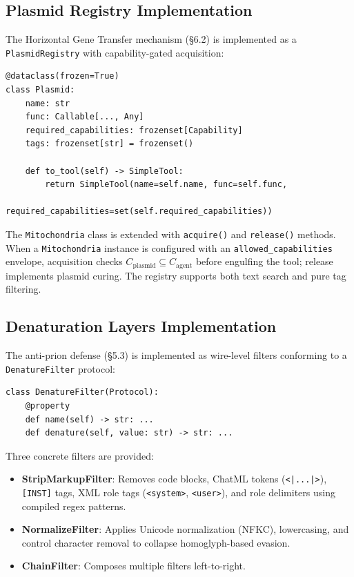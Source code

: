\subsection{Plasmid Registry Implementation}

The Horizontal Gene Transfer mechanism (\S6.2) is implemented as a \texttt{PlasmidRegistry} with capability-gated acquisition:

\begin{verbatim}
@dataclass(frozen=True)
class Plasmid:
    name: str
    func: Callable[..., Any]
    required_capabilities: frozenset[Capability]
    tags: frozenset[str] = frozenset()

    def to_tool(self) -> SimpleTool:
        return SimpleTool(name=self.name, func=self.func,
                          required_capabilities=set(self.required_capabilities))
\end{verbatim}

The \texttt{Mitochondria} class is extended with \texttt{acquire()} and \texttt{release()} methods. When a \texttt{Mitochondria} instance is configured with an \texttt{allowed\_capabilities} envelope, acquisition checks $C_{\text{plasmid}} \subseteq C_{\text{agent}}$ before engulfing the tool; release implements plasmid curing. The registry supports both text search and pure tag filtering.

\subsection{Denaturation Layers Implementation}

The anti-prion defense (\S5.3) is implemented as wire-level filters conforming to a \texttt{DenatureFilter} protocol:

\begin{verbatim}
class DenatureFilter(Protocol):
    @property
    def name(self) -> str: ...
    def denature(self, value: str) -> str: ...
\end{verbatim}

Three concrete filters are provided:
\begin{itemize}[leftmargin=*]
\item \textbf{StripMarkupFilter}: Removes code blocks, ChatML tokens (\texttt{<|...|>}), \texttt{[INST]} tags, XML role tags (\texttt{<system>}, \texttt{<user>}), and role delimiters using compiled regex patterns.
\item \textbf{NormalizeFilter}: Applies Unicode normalization (NFKC), lowercasing, and control character removal to collapse homoglyph-based evasion.
\item \textbf{ChainFilter}: Composes multiple filters left-to-right.
\end{itemize}

